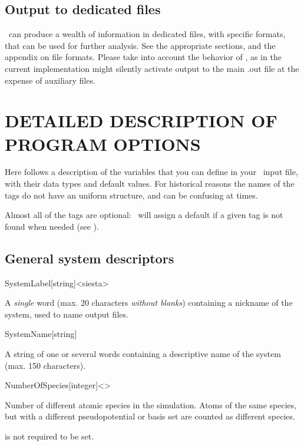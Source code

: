 \subsection{Output to dedicated files}%

\siesta\ can produce a wealth of information in dedicated files,
with specific formats, that can be used for further analysis. See the
appropriate sections, and the appendix on file formats.
Please take into account the behavior of
, as in the current implementation might silently
activate output to the main .out file at the expense of auxiliary
files.


\section{DETAILED DESCRIPTION OF PROGRAM OPTIONS}


Here follows a description of the variables that you can define in
your \siesta\ input file, with their data types and default
values. For historical reasons the names of the tags do not have an
uniform structure, and can be confusing at times.

Almost all of the tags are optional: \siesta\ will assign a
default if a given tag is not found when needed (see ).


\subsection{General system descriptors}

\begin{fdfentry}{SystemLabel}[string]<siesta>
  
  A \emph{single} word (max. 20 characters \emph{without blanks})
  containing a nickname of the system, used to name output files.

\end{fdfentry}


\begin{fdfentry}{SystemName}[string]

  A string of one or several words containing a descriptive name of
  the system (max. 150 characters).
  
\end{fdfentry}


\begin{fdfentry}{NumberOfSpecies}[integer]<>

  Number of different atomic species in the simulation.  Atoms of the
  same species, but with a different pseudopotential or basis set are
  counted as different species.

  \note is not required to be set.
  
\end{fdfentry}

